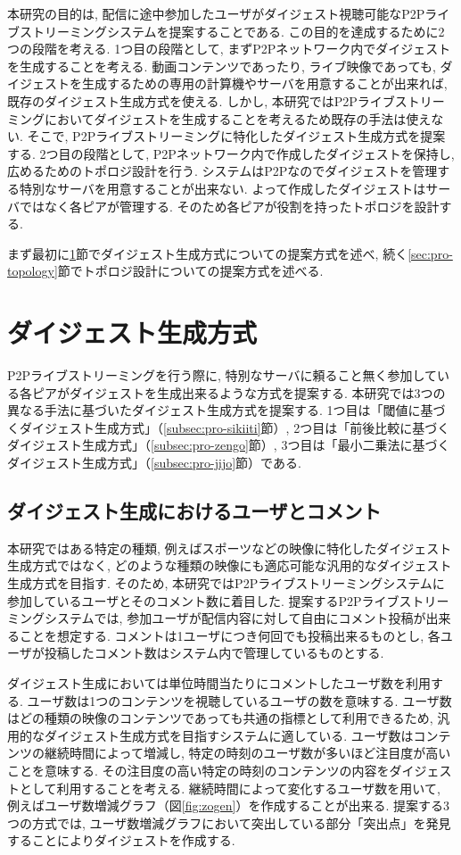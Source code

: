 本研究の目的は, 配信に途中参加したユーザがダイジェスト視聴可能なP2Pライブストリーミングシステムを提案することである. この目的を達成するために2つの段階を考える. 1つ目の段階として, まずP2Pネットワーク内でダイジェストを生成することを考える. 動画コンテンツであったり, ライブ映像であっても, ダイジェストを生成するための専用の計算機やサーバを用意することが出来れば, 既存のダイジェスト生成方式を使える. しかし, 本研究ではP2Pライブストリーミングにおいてダイジェストを生成することを考えるため既存の手法は使えない. そこで, P2Pライブストリーミングに特化したダイジェスト生成方式を提案する. 2つ目の段階として, P2Pネットワーク内で作成したダイジェストを保持し, 広めるためのトポロジ設計を行う. システムはP2Pなのでダイジェストを管理する特別なサーバを用意することが出来ない. よって作成したダイジェストはサーバではなく各ピアが管理する. そのため各ピアが役割を持ったトポロジを設計する.

まず最初に\ref{sec:pro-digest}節でダイジェスト生成方式についての提案方式を述べ, 続く\ref{sec:pro-topology}節でトポロジ設計についての提案方式を述べる.


\section{ダイジェスト生成方式}\label{sec:pro-digest}
P2Pライブストリーミングを行う際に, 特別なサーバに頼ること無く参加している各ピアがダイジェストを生成出来るような方式を提案する. 本研究では3つの異なる手法に基づいたダイジェスト生成方式を提案する. 1つ目は「閾値に基づくダイジェスト生成方式」（\ref{subsec:pro-sikiiti}節）, 2つ目は「前後比較に基づくダイジェスト生成方式」（\ref{subsec:pro-zengo}節）, 3つ目は「最小二乗法に基づくダイジェスト生成方式」（\ref{subsec:pro-jijo}節）である.

\subsection{ダイジェスト生成におけるユーザとコメント}
本研究ではある特定の種類, 例えばスポーツなどの映像に特化したダイジェスト生成方式ではなく, どのような種類の映像にも適応可能な汎用的なダイジェスト生成方式を目指す. そのため, 本研究ではP2Pライブストリーミングシステムに参加しているユーザとそのコメント数に着目した. 提案するP2Pライブストリーミングシステムでは, 参加ユーザが配信内容に対して自由にコメント投稿が出来ることを想定する. コメントは1ユーザにつき何回でも投稿出来るものとし, 各ユーザが投稿したコメント数はシステム内で管理しているものとする.

ダイジェスト生成においては単位時間当たりにコメントしたユーザ数を利用する. ユーザ数は1つのコンテンツを視聴しているユーザの数を意味する. ユーザ数はどの種類の映像のコンテンツであっても共通の指標として利用できるため, 汎用的なダイジェスト生成方式を目指すシステムに適している. ユーザ数はコンテンツの継続時間によって増減し, 特定の時刻のユーザ数が多いほど注目度が高いことを意味する. その注目度の高い特定の時刻のコンテンツの内容をダイジェストとして利用することを考える. 継続時間によって変化するユーザ数を用いて, 例えばユーザ数増減グラフ（図\ref{fig:zogen}）を作成することが出来る. 提案する3つの方式では, ユーザ数増減グラフにおいて突出している部分「突出点」を発見することによりダイジェストを作成する.

